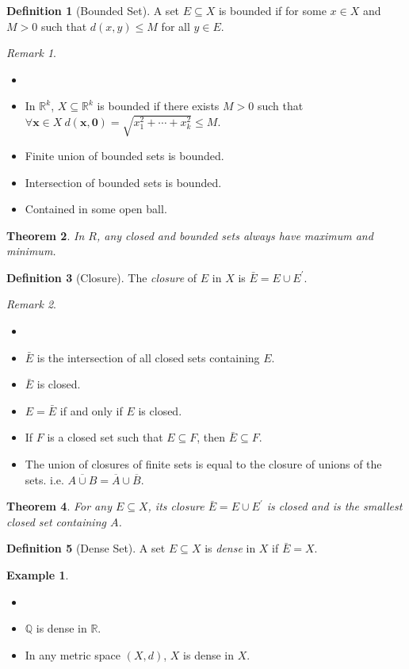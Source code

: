 \documentclass[12pt, lettersize]{book}
\theoremstyle{plain}
\newtheorem{thm}{Theorem}[section]
\theoremstyle{definition}
\newtheorem{dfn}[thm]{Definition}
\newtheorem*{eg}{Example}
\theoremstyle{remark}
\newtheorem*{rem}{Remark}
\newcommand{\R}{\mathbb{R}}
\newcommand{\Q}{\mathbb{Q}}
\begin{document}
		\begin{dfn}[Bounded Set]
			A set $E\subseteq X$ is bounded if for some $x\in X$ and $M>0$ such that $d(x,y)\leq M$ for all $y\in E$.
		\end{dfn}
		\begin{rem}
		\begin{itemize}
			\item[]
			\item In $\R^k$, $X\subseteq\R^k$ is bounded if there exists $M>0$ such that $\forall\mathbf{x}\in X\ d(\mathbf{x},\mathbf{0})=\sqrt{x_1^2+\cdots+x_k^2}\leq M$.
			\item Finite union of bounded sets is bounded.
			\item Intersection of bounded sets is bounded.
			\item Contained in some open ball.
		\end{itemize}
		\end{rem}
		
		\begin{thm}
			In $R$, any closed and bounded sets always have maximum and minimum.
		\end{thm}
		
		\begin{dfn}[Closure]
			The \emph{closure} of $E$ in $X$ is $\bar{E}=E\cup E^\prime$.
		\end{dfn}
		\begin{rem}
		\begin{itemize}
			\item[]
			\item $\bar{E}$ is the intersection of all closed sets containing $E$.
			\item $\bar{E}$ is closed.
			\item $E=\bar{E}$ if and only if $E$ is closed.
			\item If $F$ is a closed set such that $E\subseteq F$, then $\bar{E}\subseteq F$.
			\item The union of closures of finite sets is equal to the closure of unions of the sets. i.e. $\overline{A\cup B}=\overline{A}\cup\overline{B}$.
		\end{itemize}
		\end{rem}
		
		\begin{thm}
		For any $E\subseteq X$, its closure $\bar{E}=E\cup E^\prime$ is closed and is the smallest closed set containing $A$.
		\end{thm}
		
		\begin{dfn}[Dense Set]
			A set $E\subseteq X$ is \emph{dense} in $X$ if $\bar{E}=X$.
		\end{dfn}
		\begin{eg}
		\begin{itemize}
			\item[]
			\item $\Q$ is dense in $\R$.
			\item In any metric space $(X,d)$, $X$ is dense in $X$. 
		\end{itemize}
		\end{eg}
		
\end{document}

